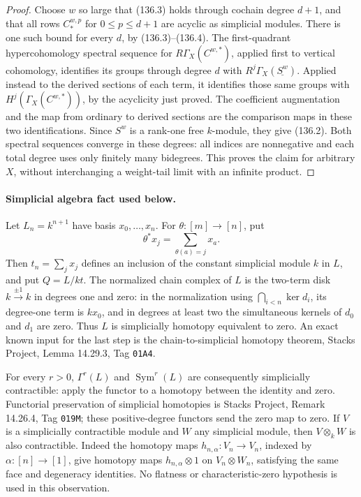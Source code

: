 \documentclass[11pt,a4paper]{article}
\theoremstyle{definition}\newtheorem{definition}[theorem]{Definition}
\theoremstyle{remark}\newtheorem{remark}[theorem]{Remark}
\begin{document}
\begin{proof}
Choose $w$ so large that (136.3) holds through cochain
degree $d+1$, and that all rows $C_*^{w,p}$ for
$0\leq p\leq d+1$ are acyclic as simplicial modules.
There is one such bound for every $d$, by (136.3)--(136.4).
The first-quadrant hypercohomology spectral sequence for
$R\Gamma_X(C^{w,*})$, applied first to vertical cohomology,
identifies its groups through degree $d$ with
$R^j\Gamma_X(\underline{S^w})$.
Applied instead to the derived sections of each term,
it identifies those same groups with
$H^j(\Gamma_X(C^{w,*}))$, by the acyclicity just proved.
The coefficient augmentation and the map from ordinary
to derived sections are the comparison maps in these two
identifications.  Since $S^w$ is a rank-one free
$k$-module, they give (136.2).
Both spectral sequences converge in these degrees:
all indices are nonnegative and each total degree uses
only finitely many bidegrees.  This proves the claim for
arbitrary $X$, without interchanging a weight-tail limit
with an infinite product.
\end{proof}

\paragraph{Simplicial algebra fact used below.}
Let $L_n=k^{n+1}$ have basis $x_0,\ldots,x_n$.  For
$\theta:[m]\to[n]$, put
\[
 \theta^*x_j=\sum_{\theta(a)=j}x_a.
\]
Then $t_n=\sum_jx_j$ defines an inclusion of the constant
simplicial module $k$ in $L$, and put $Q=L/kt$.
The normalized chain complex of $L$ is the two-term disk
$k\xrightarrow{\pm1}k$ in degrees one and zero: in the
normalization using $\bigcap_{i<n}\ker d_i$, its degree-one
term is $kx_0$, and in degrees at least two the simultaneous
kernels of $d_0$ and $d_1$ are zero.  Thus $L$ is simplicially
homotopy equivalent to zero.  An exact known input for the last
step is the chain-to-simplicial homotopy theorem, Stacks Project,
Lemma 14.29.3, Tag \nolinkurl{01A4}.

For every $r>0$, $\Gamma^r(L)$ and $\operatorname{Sym}^r(L)$
are consequently simplicially contractible: apply the functor
to a homotopy between the identity and zero.  Functorial
preservation of simplicial homotopies is Stacks Project,
Remark 14.26.4, Tag \nolinkurl{019M}; these positive-degree
functors send the zero map to zero.  If $V$ is a simplicially
contractible module and $W$ any simplicial module, then
$V\otimes_k W$ is also contractible.  Indeed the homotopy
maps $h_{n,\alpha}:V_n\to V_n$, indexed by
$\alpha:[n]\to[1]$, give homotopy maps
$h_{n,\alpha}\otimes1$ on $V_n\otimes W_n$, satisfying the
same face and degeneracy identities.  No flatness or
characteristic-zero hypothesis is used in this observation.
\end{document}
